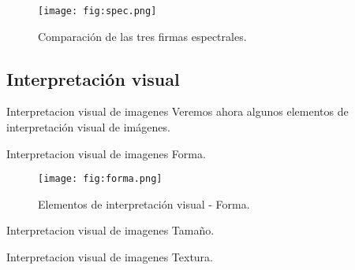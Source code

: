 \begin{frame}{}
  \begin{figure}
    \centering
    \texttt{[image: fig:spec.png]}
    \caption{Comparación de las tres firmas espectrales.}
    \label{}
  \end{figure}
\end{frame}
\subsection{Interpretación visual}

\begin{frame}{}
    \begin{block}{Interpretacion visual de imagenes}
       Veremos ahora algunos elementos de interpretación visual de imágenes.

    \end{block}
\end{frame}


\begin{frame}{}
    \begin{block}{Interpretacion visual de imagenes}
      Forma.

    \end{block}
\end{frame}

\begin{frame}{}
  \begin{figure}
    \centering
    \texttt{[image: fig:forma.png]}
    \caption{Elementos de interpretación visual - Forma.}
    \label{}
  \end{figure}
\end{frame}


\begin{frame}{}
    \begin{block}{Interpretacion visual de imagenes}
     Tamaño.

    \end{block}
\end{frame}

\begin{frame}{}
    \begin{block}{Interpretacion visual de imagenes}
      Textura.

    \end{block}
\end{frame}

